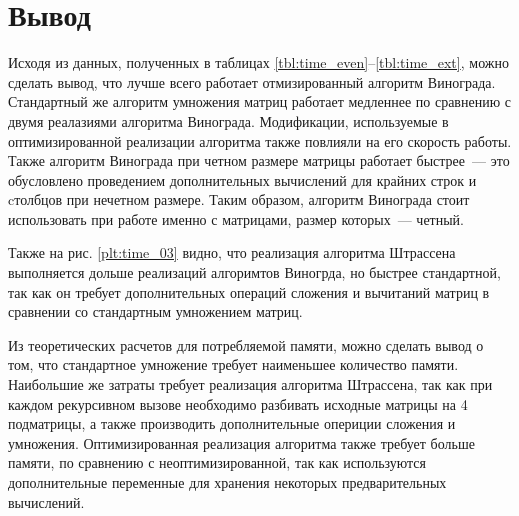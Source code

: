 \section*{Вывод}
Исходя из данных, полученных в таблицах \ref{tbl:time_even}--\ref{tbl:time_ext}, можно сделать вывод, что лучше всего работает отмизированный алгоритм Винограда.
Стандартный же алгоритм умножения матриц работает медленнее по сравнению с двумя реалазиями алгоритма Винограда.
Модификации, используемые в оптимизированной реализации алгоритма также повлияли на его скорость работы. 
Также алгоритм Винограда при четном размере матрицы работает быстрее~--- это обусловлено проведением дополнительных вычислений для крайних строк и cтолбцов при нечетном размере. 
Таким образом, алгоритм Винограда стоит использовать при работе именно с матрицами, размер которых~--- четный.

Также на рис. \ref{plt:time_03} видно, что реализация алгоритма Штрассена выполняется дольше реализаций алгоримтов Виногрда, но быстрее стандартной, так как он требует дополнительных операций сложения и вычитаний матриц в сравнении со стандартным умножением матриц.

Из теоретических расчетов для потребляемой памяти, можно сделать вывод о том, что стандартное умножение требует наименьшее количество памяти. 
Наибольшие же затраты требует реализация алгоритма Штрассена, так как при каждом рекурсивном вызове необходимо разбивать исходные матрицы на 4 подматрицы, а также производить дополнительные опериции сложения и умножения.
Оптимизированная реализация алгоритма также требует больше памяти, по сравнению с неоптимизированной, так как используются дополнительные переменные для хранения некоторых предварительных вычислений.